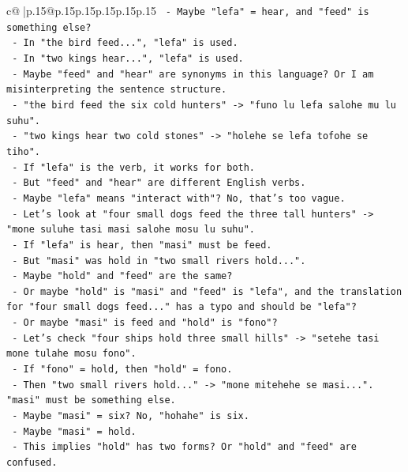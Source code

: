 \documentclass{article}
\begin{document}
{\begin{supertabular}{c@{$\;$}|p{.15\linewidth}@{}p{.15\linewidth}p{.15\linewidth}p{.15\linewidth}p{.15\linewidth}p{.15\linewidth}}
{{{\texttt{        {-} Maybe "lefa" = hear, and "feed" is something else?} \\
\texttt{        {-} In "the bird feed...", "lefa" is used.} \\
\texttt{        {-} In "two kings hear...", "lefa" is used.} \\
\texttt{        {-} Maybe "feed" and "hear" are synonyms in this language? Or I am misinterpreting the sentence structure.} \\
\texttt{        {-} "the bird feed the six cold hunters" {-}> "funo lu lefa salohe mu lu suhu".} \\
\texttt{        {-} "two kings hear two cold stones" {-}> "holehe se lefa tofohe se tiho".} \\
\texttt{        {-} If "lefa" is the verb, it works for both.} \\
\texttt{        {-} But "feed" and "hear" are different English verbs.} \\
\texttt{        {-} Maybe "lefa" means "interact with"? No, that's too vague.} \\
\texttt{        {-} Let's look at "four small dogs feed the three tall hunters" {-}> "mone suluhe tasi masi salohe mosu lu suhu".} \\
\texttt{        {-} If "lefa" is hear, then "masi" must be feed.} \\
\texttt{        {-} But "masi" was hold in "two small rivers hold...".} \\
\texttt{        {-} Maybe "hold" and "feed" are the same?} \\
\texttt{        {-} Or maybe "hold" is "masi" and "feed" is "lefa", and the translation for "four small dogs feed..." has a typo and should be "lefa"?} \\
\texttt{        {-} Or maybe "masi" is feed and "hold" is "fono"?} \\
\texttt{        {-} Let's check "four ships hold three small hills" {-}> "setehe tasi mone tulahe mosu fono".} \\
\texttt{        {-} If "fono" = hold, then "hold" = fono.} \\
\texttt{        {-} Then "two small rivers hold..." {-}> "mone mitehehe se masi...". "masi" must be something else.} \\
\texttt{        {-} Maybe "masi" = six? No, "hohahe" is six.} \\
\texttt{        {-} Maybe "masi" = hold.} \\
\texttt{        {-} This implies "hold" has two forms? Or "hold" and "feed" are confused.} \\
}}}
\end{supertabular}}
\end{document}
